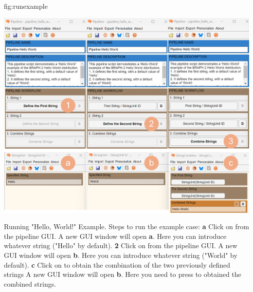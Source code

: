 \documentclass{tufte-handout}
\begin{document}


{fig:runexample}
{\centerline{\includegraphics{fig03.jpg}}}
{Running "Hello, World!" Example.}
{
	Steps to run the example case:
	{\bf a} Click on  from the pipeline GUI. A new GUI window will open {\bf a}. Here you can introduce whatever string ("Hello" by default).
	{\bf 2} Click on  from the pipeline GUI. A new GUI window will open {\bf b}. Here you can introduce whatever string ("World" by default).
	{\bf c} Click on  to obtain the combination of the two previously defined strings A new GUI window will open {\bf b}. Here you need to press   to obtained the combined strings. 
}

\end{document}
